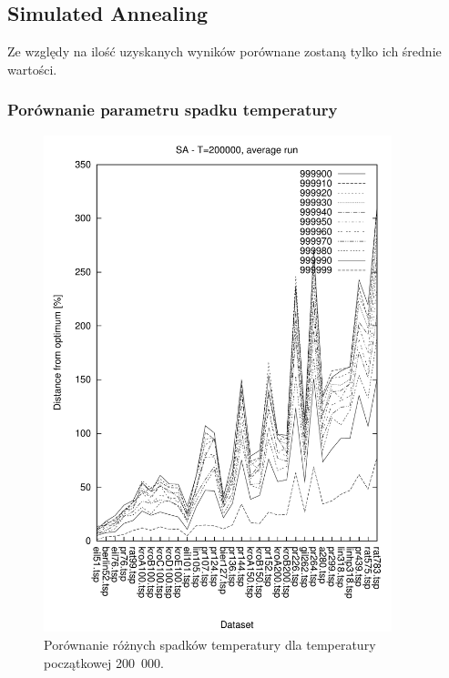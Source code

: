 \subsection{Simulated Annealing}

\it

Ze względy na ilość uzyskanych wyników porównane zostaną tylko ich średnie wartości.

\rm

\subsubsection{Porównanie parametru spadku temperatury}

\begin{figure}
\begin{center}
\includegraphics[width=0.9\textwidth]{wykresy/sa/sa_200000_av}
\end{center}
\caption{Porównanie różnych spadków temperatury dla temperatury początkowej 200~000.}
\label{sa_200000_av}
\end{figure}

